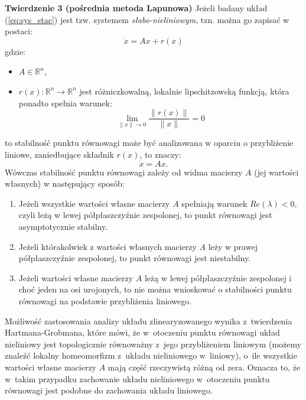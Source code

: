 \documentclass{article}
\begin{document}
\textbf{Twierdzenie 3 (pośrednia metoda Lapunowa)}
Jeżeli badany układ (\ref{eq:sys_stac}) jest tzw. systemem \textit{słabo-nieliniowym}, tzn. można go zapisać w postaci:
\begin{equation}\label{eq:sys_slabo_niel}
    \dot{x} = Ax + r(x)
\end{equation}
gdzie:
\begin{itemize}
    \item $A \in \mathbb{R}^{n}$,
    \item $r(x): \mathbb{R}^{n} \rightarrow \mathbb{R}^{n}$ jest różniczkowalną, lokalnie lipschitzowską funkcją, która ponadto spełnia warunek:
    \begin{equation}\label{eq:warunek_slabo_niel}
        \lim_{\lVert x \rVert \rightarrow 0} \frac{\lVert r(x) \rVert}{\lVert x \rVert} = 0
    \end{equation}
\end{itemize}
to stabilność punktu równowagi może być analizowana w oparciu o przybliżenie liniowe, zaniedbujące składnik $r(x)$, to znaczy:
$$  
    \dot{x} = Ax.
$$
Wówczas stabilność punktu równowagi zależy od widma macierzy $A$ (jej wartości własnych) w następujący sposób:
\begin{enumerate}
    \item Jeżeli wszystkie wartości własne macierzy $A$ spełniają warunek $Re(\lambda) < 0$, czyli leżą w lewej półpłaszczyźnie zespolonej,  to punkt równowagi jest asymptotycznie stabilny.
    \item Jeżeli którakolwiek z wartości własnych macierzy $A$ leży w prawej półpłaszczyźnie zespolonej, to punkt równowagi jest niestabilny.
    \item Jeżeli wartości własne macierzy $A$ leżą w lewej półpłaszczyźnie zespolonej i choć jeden na osi urojonych, to nie można wnioskować o stabilności punktu równowagi na podstawie przybliżenia liniowego.
\end{enumerate}

\begin{tcolorbox}[colback=orange!5, colframe=orange!75!black, title=Uwaga]
Możliwość zastosowania analizy układu zlinearyzowanego wynika z~twierdzenia
Hartmana-Grobmana, które mówi, że w~otoczeniu punktu równowagi układ nieliniowy
jest topologicznie równoważny z~jego przybliżeniem liniowym (możemy znaleźć lokalny
homeomorfizm z~układu nieliniowego w~liniowy), o~ile wszystkie
wartości własne macierzy $A$ mają część rzeczywistą różną od zera.
Oznacza to, że w~takim przypadku zachowanie układu nieliniowego w~otoczeniu
punktu równowagi jest podobne do zachowania układu liniowego. 
\end{tcolorbox}
\end{document}

